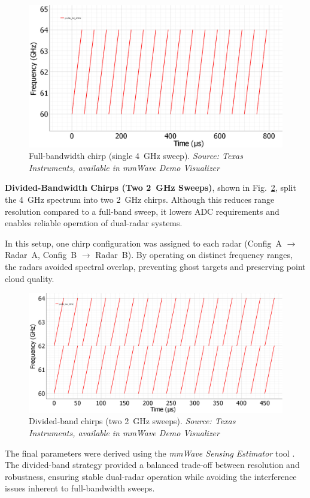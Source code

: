 \begin{figure}[!htbp]
    \centering
    \includegraphics[width=0.7\linewidth]{images/profile_full_4GHz.png}
    \caption{Full-bandwidth chirp (single 4~GHz sweep).  
    \textit{Source: Texas Instruments, available in mmWave Demo Visualizer \cite{mmwave_demo_doc}}}
    \label{fig:profile4GHz}
\end{figure}

\textbf{Divided-Bandwidth Chirps (Two 2~GHz Sweeps)}, shown in Fig.~\ref{fig:profile2GHz}, split the 4~GHz spectrum into two 2~GHz chirps.  
Although this reduces range resolution compared to a full-band sweep, it lowers ADC requirements and enables reliable operation of dual-radar systems.  

In this setup, one chirp configuration was assigned to each radar (Config~A $\rightarrow$ Radar~A, Config~B $\rightarrow$ Radar~B).  
By operating on distinct frequency ranges, the radars avoided spectral overlap, preventing ghost targets and preserving point cloud quality.  

\begin{figure}[!htbp]
    \centering
    \includegraphics[width=0.7\linewidth]{images/profile_two_2GHz.png}
    \caption{Divided-band chirps (two 2~GHz sweeps).  
    \textit{Source: Texas Instruments, available in mmWave Demo Visualizer \cite{mmwave_demo_doc}}}
    \label{fig:profile2GHz}
\end{figure}

The final parameters were derived using the \textit{mmWave Sensing Estimator} tool \cite{mmwave_demo_output}.  
The divided-band strategy provided a balanced trade-off between resolution and robustness, ensuring stable dual-radar operation while avoiding the interference issues inherent to full-bandwidth sweeps.

